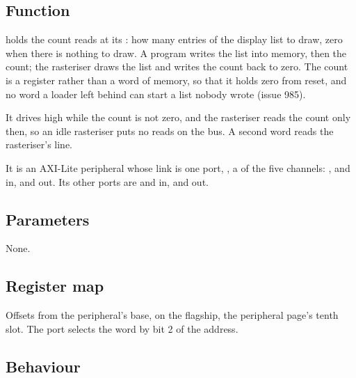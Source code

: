
%
{}

\subsection*{Function}

 holds the count  reads at its
: how many entries of the display list to draw, zero when
there is nothing to draw. A program writes the list into memory, then
the count; the rasteriser draws the list and writes the count back to
zero. The count is a register rather than a word of memory, so that
it holds zero from reset, and no word a loader left behind can start
a list nobody wrote (issue 985).

It drives  high while the count is not zero, and the
rasteriser reads the count only then, so an idle rasteriser puts no
reads on the bus. A second word reads the rasteriser's 
line.

It is an AXI-Lite peripheral whose link is one port, , a
 of the five channels: , 
and  in,  and  out. Its other
ports are  and  in, and  out.

\subsection*{Parameters}

None.

\subsection*{Register map}

Offsets from the peripheral's base,  on the flagship, the
peripheral page's tenth slot. The port selects the word by bit 2 of
the address.



\subsection*{Behaviour}

